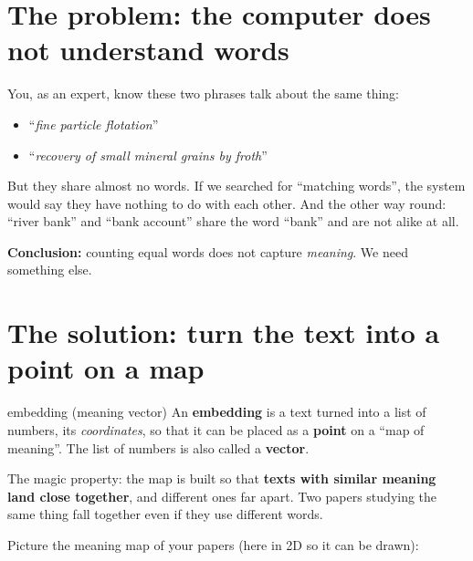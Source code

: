 \documentclass[11pt,a4paper]{article}
\begin{document}

\section{The problem: the computer does not understand words}

You, as an expert, know these two phrases talk about the same thing:
\begin{itemize}
  \item ``\emph{fine particle flotation}''
  \item ``\emph{recovery of small mineral grains by froth}''
\end{itemize}
But they share almost no words. If we searched for ``matching words'', the system would say
they have nothing to do with each other. And the other way round: ``river bank'' and ``bank
account'' share the word ``bank'' and are not alike at all.

\textbf{Conclusion:} counting equal words does not capture \emph{meaning}. We need something
else.

\section{The solution: turn the text into a point on a map}

\begin{concepto}{embedding (meaning vector)}
An \textbf{embedding} is a text turned into a list of numbers, its \emph{coordinates}, so
that it can be placed as a \textbf{point} on a ``map of meaning''. The list of numbers is
also called a \textbf{vector}.

The magic property: the map is built so that \textbf{texts with similar meaning land close
together}, and different ones far apart. Two papers studying the same thing fall together
even if they use different words.
\end{concepto}

Picture the meaning map of your papers (here in 2D so it can be drawn):

\begin{center}
\end{center}
\end{document}
